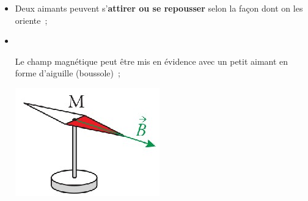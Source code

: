 \documentclass[../../main/main.tex]{subfiles}
\begin{document}
\begin{itemize}
  \item Deux aimants peuvent s'\textbf{attirer ou se repousser} selon la façon
    dont on les oriente~;
  \item ~
    \smallbreak
    \vspace{-30pt}
    \noindent
  \begin{minipage}[c]{.80\linewidth}
    Le champ magnétique peut être mis en évidence avec un petit aimant en
	      forme d'aiguille (boussole)~;
  \end{minipage}
  \begin{minipage}[c]{.19\linewidth}
      \begin{center}
        \includegraphics[width=.7\linewidth]{boussole}
      \end{center}
  \end{minipage}
\end{itemize}
\end{document}
